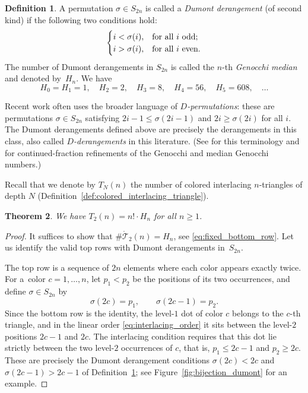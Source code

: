 \documentclass[pdftex]{sigma}
\numberwithin{equation}{section}
\newtheorem{Theorem}{Theorem}[section]
\theoremstyle{definition}
\newtheorem{Definition}[Theorem]{Definition}
\begin{document}
\begin{Definition}\label{def:derrangement} A permutation $\sigma\in S_{2n}$ is called a
	\emph{Dumont derangement} (of second kind) if the following two conditions
	hold:
	\begin{equation*}
		\begin{cases}
			i< \sigma(i), & \textnormal{for all $i$ odd};			\\
			i> \sigma(i), & \textnormal{for all $i$ even}.
		\end{cases}
	\end{equation*}
	The number of Dumont derangements in $S_{2n}$ is called the $n$-th
	\emph{Genocchi median} and denoted by~$H_n$.
	We have
	\begin{equation*}
		H_0=H_1=1,\quad H_2=2,\quad H_3=8,\quad H_4=56,\quad H_5=608,\quad
		\dots
	\end{equation*}
\end{Definition}

Recent work often uses the broader language of \emph{$D$-permutations}: these
are permutations $\sigma\in S_{2n}$ satisfying $2i-1\le\sigma(2i-1)$ and
$2i\ge\sigma(2i)$ for all $i$.
The Dumont derangements defined above are precisely the derangements in this
class, also called \emph{$D$-derangements} in this literature. (See
\cite{LazarWachs2019} for this terminology and \cite{DebSokal2024} for
continued-fraction refinements of the Genocchi and median Genocchi numbers.)

Recall that we denote by $T_N(n)$ the number of colored interlacing
$n$-triangles of depth $N$ (Definition~\ref{def:colored_interlacing_triangle}).

\begin{Theorem}
	\label{thm:Genocchi_counts} We have $T_2(n)=n!\cdot H_n$ for all $n\geq 1$.
\end{Theorem}
\begin{proof}
	It suffices to show that $\# \mathring{\mathcal{T}}_2(n) = H_n$, see
	\eqref{eq:fixed_bottom_row}.
	Let us identify the valid top rows with Dumont derangements in~$S_{2n}$.

	The top row is a sequence of $2n$ elements where each color appears exactly
	twice.
	For a~color $c=1,\dots,n $, let $p_1 < p_2$ be the positions of its two
	occurrences, and define $\sigma \in S_{2n}$ by
	\begin{equation*}
		\sigma(2c) = p_1, \qquad \sigma(2c-1) = p_2.
	\end{equation*}
	Since the bottom row is the identity, the level-$1$ dot of color $c$
	belongs to the $c$-th triangle, and in the linear order
	\eqref{eq:interlacing_order} it sits between the level-$2$ positions
	$2c-1$ and $2c$.
	The interlacing condition requires that this dot lie strictly between the
	two level-$2$ occurrences of $c$, that is, $p_1 \le 2c-1$ and
	$p_2 \ge 2c$.
	These are precisely the Dumont derangement conditions $\sigma(2c) < 2c$
	and $\sigma(2c-1) > 2c-1$ of Definition~\ref{def:derrangement}; see
	Figure~\ref{fig:bijection_dumont} for an example.
\end{proof}
\end{document}
